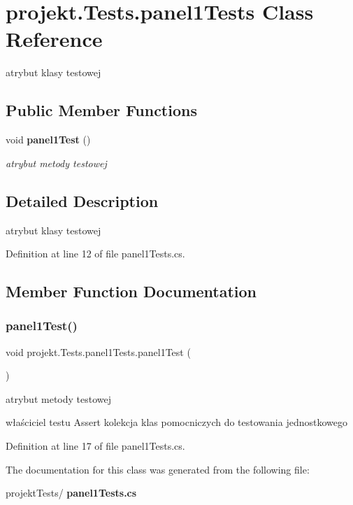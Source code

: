 \section{projekt.\+Tests.\+panel1\+Tests Class Reference}
\label{classprojekt_1_1Tests_1_1panel1Tests}


atrybut klasy testowej  


\subsection*{Public Member Functions}
\begin{DoxyCompactItemize}
\item 
void \textbf{ panel1\+Test} ()
\begin{DoxyCompactList}\small\item\em atrybut metody testowej \end{DoxyCompactList}\end{DoxyCompactItemize}


\subsection{Detailed Description}
atrybut klasy testowej 

Definition at line 12 of file panel1\+Tests.\+cs.



\subsection{Member Function Documentation}
\mbox{\label{classprojekt_1_1Tests_1_1panel1Tests_a90a569f56e8769cbdeefbe41affdb184}} 
\subsubsection{panel1\+Test()}
{\footnotesize\ttfamily void projekt.\+Tests.\+panel1\+Tests.\+panel1\+Test (\begin{DoxyParamCaption}{ }\end{DoxyParamCaption})\hspace{0.3cm}{\ttfamily [inline]}}



atrybut metody testowej 

właściciel testu Assert kolekcja klas pomocniczych do testowania jednostkowego 

Definition at line 17 of file panel1\+Tests.\+cs.



The documentation for this class was generated from the following file\+:\begin{DoxyCompactItemize}
\item 
projekt\+Tests/\textbf{ panel1\+Tests.\+cs}\end{DoxyCompactItemize}
